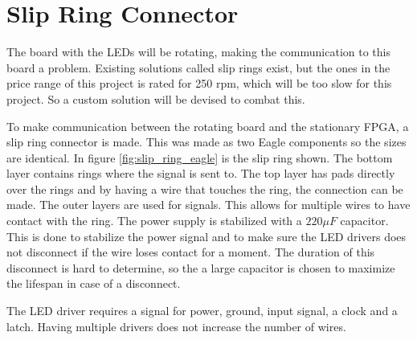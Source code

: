 \section{Slip Ring Connector}
The board with the LEDs will be rotating, making the communication to this board a problem.
Existing solutions called slip rings exist, but the ones in the price range of this project is rated for 250 rpm, which will be too slow for this project.
So a custom solution will be devised to combat this.

To make communication between the rotating board and the stationary FPGA, a slip ring connector is made.
This was made as two Eagle components so the sizes are identical.
In figure \ref{fig:slip_ring_eagle} is the slip ring shown.
The bottom layer contains rings where the signal is sent to.
The top layer has pads directly over the rings and by having a wire that touches the ring, the connection can be made.
The outer layers are used for signals.
This allows for multiple wires to have contact with the ring.
The power supply is stabilized with a $220 \mu F$ capacitor.
This is done to stabilize the power signal and to make sure the LED drivers does not disconnect if the wire loses contact for a moment.
The duration of this disconnect is hard to determine, so the a large capacitor is chosen to maximize the lifespan in case of a disconnect.

The LED driver requires a signal for power, ground, input signal, a clock and a latch.
Having multiple drivers does not increase the number of wires.

